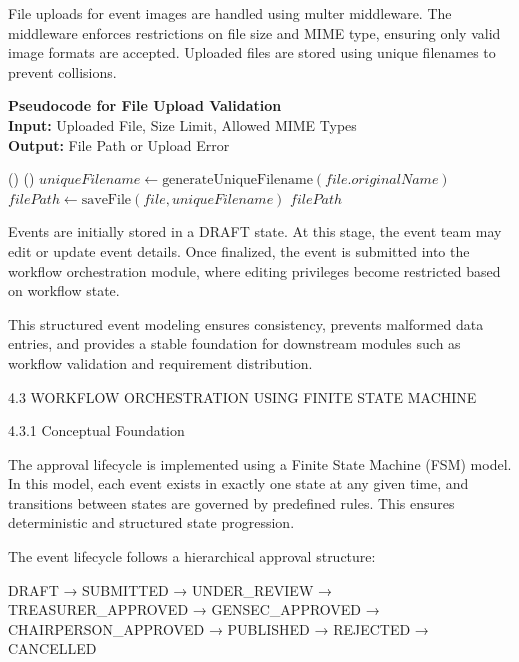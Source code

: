 File uploads for event images are handled using multer middleware. The middleware enforces restrictions on file size and MIME type, ensuring only valid image formats are accepted. Uploaded files are stored using unique filenames to prevent collisions.

\noindent\textbf{Pseudocode for File Upload Validation} 
\vspace{.2em} \\
\noindent\textbf{Input:} Uploaded File, Size Limit, Allowed MIME Types\\
\noindent\textbf{Output:} File Path or Upload Error
\begin{algorithmic}[1]
        \State \Return {}()
    \EndIf
        \State \Return {}()
    \EndIf
    \State $uniqueFilename \gets \text{generateUniqueFilename}(file.originalName)$
    \State $filePath \gets \text{saveFile}(file, uniqueFilename)$
    \State \Return $filePath$
\EndFunction
\end{algorithmic}

Events are initially stored in a DRAFT state. At this stage, the event team may edit or update event details. Once finalized, the event is submitted into the workflow orchestration module, where editing privileges become restricted based on workflow state.

This structured event modeling ensures consistency, prevents malformed data entries, and provides a stable foundation for downstream modules such as workflow validation and requirement distribution.

4.3 WORKFLOW ORCHESTRATION USING FINITE STATE MACHINE

4.3.1 Conceptual Foundation

The approval lifecycle is implemented using a Finite State Machine (FSM) model. In this model, each event exists in exactly one state at any given time, and transitions between states are governed by predefined rules. This ensures deterministic and structured state progression.

The event lifecycle follows a hierarchical approval structure:

DRAFT → SUBMITTED → UNDER_REVIEW → TREASURER_APPROVED → GENSEC_APPROVED → CHAIRPERSON_APPROVED → PUBLISHED → REJECTED → CANCELLED

